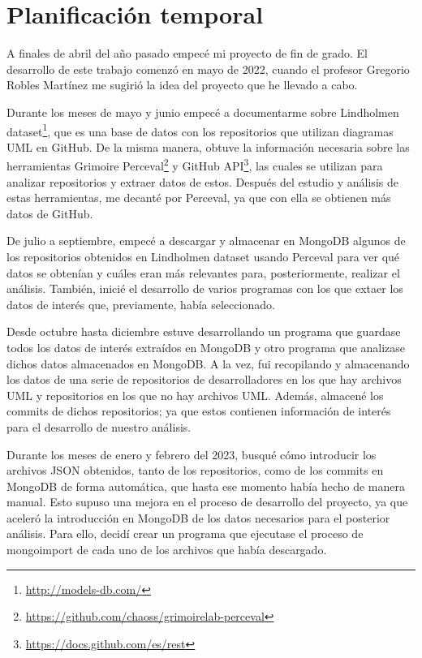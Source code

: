 \documentclass[a4paper, 12pt]{book}
\begin{document}
\section{Planificación temporal}
\label{sec:planificacion-temporal}

A finales de abril del año pasado empecé mi proyecto de fin de grado. 
El desarrollo de este trabajo comenzó en mayo de 2022, cuando el profesor Gregorio Robles Martínez me sugirió la idea del proyecto que he llevado a cabo. 


Durante los meses de mayo y junio empecé a documentarme sobre Lindholmen dataset\footnote{\url{http://models-db.com/}}, que es una base de datos con los repositorios que utilizan diagramas UML en GitHub.
De la misma manera, obtuve la información necesaria sobre las herramientas Grimoire Perceval\footnote{\url{https://github.com/chaoss/grimoirelab-perceval}} y GitHub API\footnote{\url{https://docs.github.com/es/rest}}, las cuales se utilizan para analizar repositorios y extraer datos de estos. 
Después del estudio y análisis de estas herramientas, me decanté por Perceval, ya que con ella se obtienen más datos de GitHub.


De julio a septiembre, empecé a descargar y almacenar en MongoDB algunos de los repositorios obtenidos en Lindholmen dataset usando Perceval para ver qué datos se obtenían y cuáles eran más relevantes para, posteriormente, realizar el análisis.
También, inicié el desarrollo de varios programas con los que extaer los datos de interés que, previamente, había seleccionado.


Desde octubre hasta diciembre estuve desarrollando un programa que guardase todos los datos de interés extraídos en MongoDB y otro programa que analizase dichos datos almacenados en MongoDB.
A la vez, fui recopilando y almacenando los datos de una serie de repositorios de desarrolladores en los que hay archivos UML y repositorios en los que no hay archivos UML.
Además, almacené los commits de dichos repositorios; ya que estos contienen información de interés para el desarrollo de nuestro análisis.


Durante los meses de enero y febrero del 2023, busqué cómo introducir los archivos JSON obtenidos, tanto de los repositorios, como de los commits en MongoDB de forma automática, que hasta ese momento había hecho de manera manual.
Esto supuso una mejora en el proceso de desarrollo del proyecto, ya que aceleró la introducción en MongoDB de los datos necesarios para el posterior análisis.
Para ello, decidí crear un programa que ejecutase el proceso de mongoimport de cada uno de los archivos que había descargado. 
\end{document}
